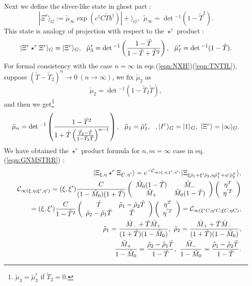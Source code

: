 \documentclass[12pt,a4paper]{article}
\def\T{{\tilde T}}
\def\M0{{\tilde M}_0}
\def\Mp{{\tilde M}_+}
\def\Mm{{\tilde M}_-}
\def\tm{{\tilde \mu}}
\begin{document}
Next we define the sliver-like state in ghost part :
\begin{equation}
|\Xi^r\rangle_G:=\tm_\infty \exp\left(c^\dagger C\T b^\dagger\right)|+\rangle_G,\ \ \tm_\infty=\det{}^{-1}\left(1-\T^2\right).
\end{equation}
This state is analogy of projection with respect to the  $\star^r$ product :
\begin{equation}
|\Xi^r\star^r\Xi^r\rangle_G=|\Xi^r\rangle_G,\ \ 
\tm_3^r=\det{}^{-1}\left({1-\T \over1-\T +\T^2}\right),\ \ 
\tm_I^r=\det{}^{-1}(1-\T ).
\end{equation}
For formal consistency with the case $n=\infty$ in eqs.(\ref{eqn:NXH})(\ref{eqn:TNTIL}), suppose $(\T -\T_2)^n\rightarrow0\  (n\rightarrow\infty)$, we fix $\tm_2$ as
\begin{equation}
\tm_2=\det{}^{-1}(1-\T_2 \T ),
\end{equation}
and then we get\footnote{
	$\tm_3=\tm_3^r$ if $\T_2=0$.
}
\begin{equation}
\tm_n=\det{}^{-1}\left({1-\T^2\over1+\T \left({\T_2-\T \over1-\T_2\T }\right)^{n-1}}\right),\ \ \tm_1=\tm_I^r,\ \ ,|I^r\rangle_G=|1\rangle_G,\ |\Xi^r\rangle=|\infty\rangle_G.
\end{equation}
We have obtained the $\star^r$ product formula for $n,m=\infty$ case in eq.(\ref{eqn:GNMSTRR}) :
\begin{eqnarray}
&&|\Xi_{\xi,\eta}\star^r\Xi_{\xi',\eta'}\rangle=e^{-{\cal C}_{\infty(\xi,\eta;\xi',\eta')}}|\Xi_{\xi{\tilde \rho}_1+\xi'{\tilde \rho}_2,\eta{\tilde \rho}_1^T+\eta'{\tilde \rho}_2^T}\rangle,\nonumber \\
&&{\cal C}_{\infty(\xi,\eta;\xi',\eta')}=(\xi,\xi'){C\over(1-\M0 )(1+\T )}
\left(
\begin{array}{cc}
\M0 (1-\T )  & \Mm  \\
\Mp     & \M0 (1-\T )
\end{array}
\right)
\left(
\begin{array}{c}
\eta^T    \\
\eta^{'T}     
\end{array}
\right)\nonumber \\
&&=(\xi,\xi'){C\over1-\T^2}
\left(
\begin{array}{cc}
\T  & {\tilde \rho}_1-{\tilde \rho}_2\T  \\
{\tilde \rho}_2-{\tilde \rho}_1\T     & \T
\end{array}
\right)
\left(
\begin{array}{c}
\eta^T    \\
\eta^{'T}     
\end{array}
\right)
={\cal C}_{\infty(\xi'C,\eta'C;\xi C,\eta C)},\nonumber \\
&&{\tilde \rho}_1={\Mm +\T \Mp \over(1+\T )(1-\M0 )},\ {\tilde \rho}_2={\Mp +\T \Mm \over(1+\T )(1-\M0 )},\nonumber \\
&&{\Mp\over1-\M0 }={{\tilde \rho}_2-{\tilde \rho}_1\T \over1-\T },\ {\Mm\over1-\M0 }={{\tilde \rho}_1-{\tilde \rho}_2\T \over1-\T }.\nonumber \\
\end{eqnarray}
\end{document}
